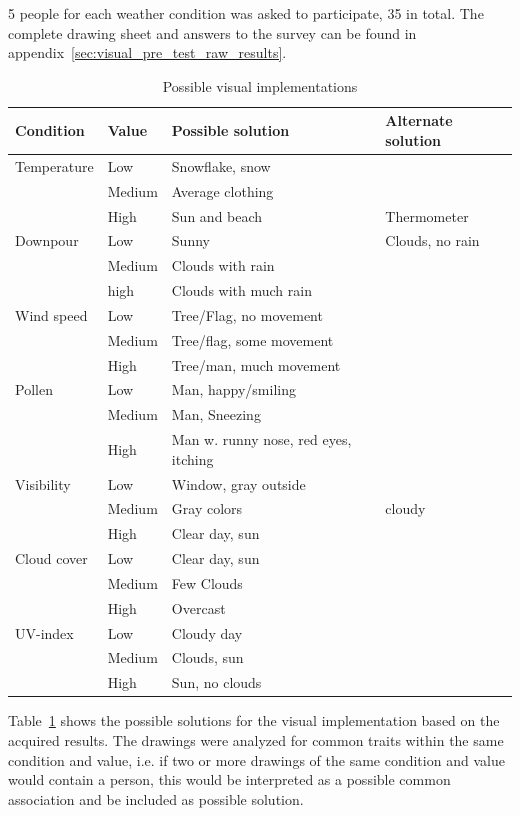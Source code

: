 5 people for each weather condition was asked to participate, 35 in total. 
The complete drawing sheet and answers to the survey can be found in appendix~\ref{sec:visual_pre_test_raw_results}.

\begin{table}[!htbp]
    \centering
    \begin{tabular}{l | l | l | l}
    Condition & Value & Possible solution & Alternate solution \\
    \hline \hline
    Temperature & Low & Snowflake, snow &  \\
    & Medium & Average clothing \\
    & High & Sun and beach & Thermometer \\
    \hline
    Downpour & Low & Sunny & Clouds, no rain \\
    & Medium & Clouds with rain & \\
    & high & Clouds with much rain & \\
    \hline
    Wind speed & Low & Tree/Flag, no movement & \\
    & Medium & Tree/flag, some movement & \\
    & High & Tree/man, much movement & \\
    \hline
    Pollen & Low & Man, happy/smiling & \\
    & Medium & Man, Sneezing & \\
    & High & Man w. runny nose, red eyes, itching & \\
    \hline
    Visibility & Low & Window, gray outside & \\
    & Medium & Gray colors & cloudy \\
    & High & Clear day, sun & \\
    \hline
    Cloud cover & Low & Clear day, sun & \\
    & Medium & Few Clouds & \\
    & High & Overcast & \\
    \hline
    UV-index & Low & Cloudy day & \\
    & Medium & Clouds, sun & \\
    & High & Sun, no clouds & \\
    \end{tabular}
    \caption{Possible visual implementations}
    \label{tab:visual_pre_test}
\end{table}

Table~\ref{tab:visual_pre_test} shows the possible solutions for the visual implementation based on the acquired results.
The drawings were analyzed for common traits within the same condition and value, i.e. if two or more drawings of the same condition and value would contain a person, this would be interpreted as a possible common association and be included as possible solution.

